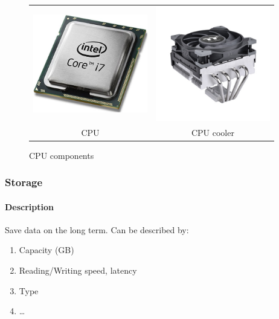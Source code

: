 \documentclass[11pt]{article}
\begin{document}
					\begin{figure}[h!]
							\centering
							\begin{tabular}[!h]{c|c}
								\includegraphics[width=5cm]{figures/CPU.jpg} & \includegraphics[width=5cm]{figures/CPU_cooler.jpg} \\
								CPU                                          & CPU cooler
							\end{tabular}
							\caption{CPU components}
					\end{figure}

			\subsubsection{Storage}

				\paragraph{Description}
					Save data on the long term. Can be described by:
					\begin{enumerate}
							\item Capacity (GB)
							\item Reading/Writing speed, latency
							\item Type
							\item \ldots
					\end{enumerate}
\end{document}
